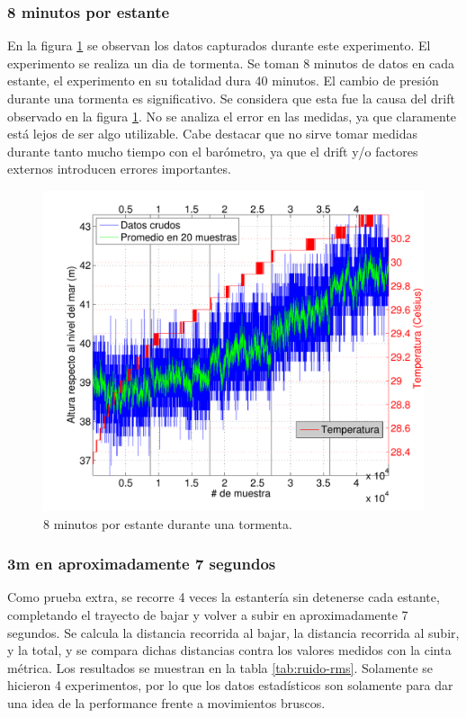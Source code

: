 \documentclass[spanish,12pt,a4paper,titlepage]{report}
\begin{document}
\subsubsection{8 minutos por estante}

En la figura \ref{fig:cm-8min-por-estante.pdf} se observan los datos capturados durante este experimento. El experimento se realiza un dia de tormenta. Se toman 8 minutos de datos en cada estante, el experimento en su totalidad dura 40 minutos. El cambio de presión durante una tormenta es significativo. Se considera que esta fue la causa del drift observado en la figura \ref{fig:cm-8min-por-estante.pdf}. No se analiza el error en las medidas, ya que claramente está lejos de ser algo utilizable. Cabe destacar que no sirve tomar medidas durante tanto mucho tiempo con el barómetro, ya que el drift y/o factores externos introducen errores importantes.

\begin{figure}[H]
\centering
  \includegraphics[width=1\textwidth]{./pics/cm-8min-por-estante.pdf}
  \caption{8 minutos por estante durante una tormenta.}
  \label{fig:cm-8min-por-estante.pdf}
\end{figure}

\newpage
\subsubsection{3m en aproximadamente 7 segundos}

Como prueba extra, se recorre 4 veces la estantería sin detenerse cada estante, completando el trayecto de bajar y volver a subir en aproximadamente 7 segundos. Se calcula la distancia recorrida al bajar, la distancia recorrida al subir, y la total, y se compara dichas distancias contra los valores medidos con la cinta métrica. Los resultados se muestran en la tabla \ref{tab:ruido-rms}. Solamente se hicieron 4 experimentos, por lo que los datos estadísticos son solamente para dar una idea de la performance frente a movimientos bruscos.
\end{document}
